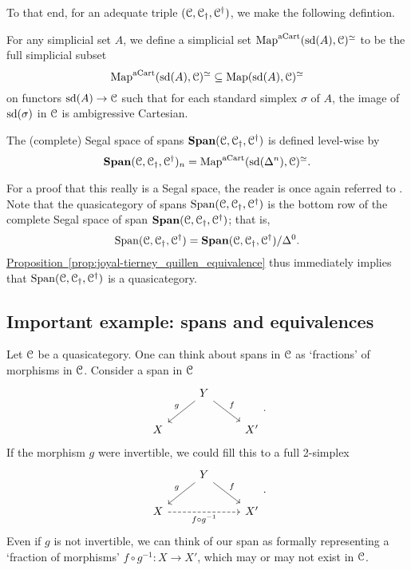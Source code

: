 \documentclass[main.tex]{subfiles}
\begin{document}
To that end, for an adequate triple $(\mathcal{C}, \mathcal{C}_{\dagger}, \mathcal{C}^{\dagger})$, we make the following defintion.
\begin{definition}
  \label{def:acart}
  For any simplicial set $A$, we define a simplicial set $\mathrm{Map}^{\mathrm{aCart}}(\mathrm{sd}(A), \mathcal{C})^{\simeq}$ to be the full simplicial subset
  \begin{equation*}
    \mathrm{Map}^{\mathrm{aCart}}(\mathrm{sd}(A), \mathcal{C})^{\simeq} \subseteq \mathrm{Map}(\mathrm{sd}(A), \mathcal{C})^{\simeq}
  \end{equation*}
  on functors $\mathrm{sd}(A) \to \mathcal{C}$ such that for each standard simplex $\sigma$ of $A$, the image of $\mathrm{sd}(\sigma)$ in $\mathcal{C}$ is ambigressive Cartesian. 
\end{definition}

\begin{definition}
  The (complete) Segal space of spans $\mathbf{Span}(\mathcal{C}, \mathcal{C}_{\dagger}, \mathcal{C}^{\dagger})$ is defined level-wise by 
  \begin{equation*}
    \mathbf{Span}(\mathcal{C}, \mathcal{C}_{\dagger}, \mathcal{C}^{\dagger})_{n} = \mathrm{Map}^{\mathrm{aCart}}(\mathrm{sd}(\Delta^{n}), \mathcal{C})^{\simeq}.
  \end{equation*}
\end{definition}

For a proof that this really is a Segal space, the reader is once again referred to \cite{spectralmackeyfunctors1}. Note that the quasicategory of spans $\mathrm{Span}(\mathcal{C}, \mathcal{C}_{\dagger}, \mathcal{C}^{\dagger})$ is the bottom row of the complete Segal space of span $\mathbf{Span}(\mathcal{C}, \mathcal{C}_{\dagger}, \mathcal{C}^{\dagger})$; that is,
\begin{equation*}
  \mathrm{Span}(\mathcal{C}, \mathcal{C}_{\dagger}, \mathcal{C}^{\dagger}) = \mathbf{Span}(\mathcal{C}, \mathcal{C}_{\dagger}, \mathcal{C}^{\dagger})/\Delta^{0}.
\end{equation*}
\hyperref[prop:joyal-tierney_quillen_equivalence]{Proposition~\ref*{prop:joyal-tierney_quillen_equivalence}} thus immediately implies that $\mathrm{Span}(\mathcal{C}, \mathcal{C}_{\dagger}, \mathcal{C}^{\dagger})$ is a quasicategory.

\subsection{Important example: spans and equivalences}
\label{ssc:important_example_spans_and_equivalences}

Let $\mathcal{C}$ be a quasicategory. One can think about spans in $\mathcal{C}$ as `fractions' of morphisms in $\mathcal{C}$. Consider a span in $\mathcal{C}$
\begin{equation*}
  \begin{tikzcd}
    & Y
    \arrow[dl, swap, "g"]
    \arrow[dr, "f"]
    \\
    X
    && X'
  \end{tikzcd}.
\end{equation*}
If the morphism $g$ were invertible, we could fill this to a full 2-simplex
\begin{equation*}
  \begin{tikzcd}
    & Y
    \arrow[dl, swap, "g"]
    \arrow[dr, "f"]
    \\
    X
    \arrow[rr, swap, dashed, "f \circ g^{-1}"]
    && X'
  \end{tikzcd}.
\end{equation*}
Even if $g$ is not invertible, we can think of our span as formally representing a `fraction of morphisms' $f \circ g^{-1}\colon X \to X'$, which may or may not exist in $\mathcal{C}$.
\end{document}
